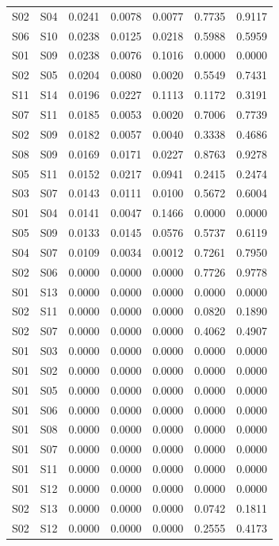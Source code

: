 \begin{table}
\begin{tabular}{llrrrrr}
S02 & S04 & 0.0241 & 0.0078 & 0.0077 & 0.7735 & 0.9117 \\
S06 & S10 & 0.0238 & 0.0125 & 0.0218 & 0.5988 & 0.5959 \\
S01 & S09 & 0.0238 & 0.0076 & 0.1016 & 0.0000 & 0.0000 \\
S02 & S05 & 0.0204 & 0.0080 & 0.0020 & 0.5549 & 0.7431 \\
S11 & S14 & 0.0196 & 0.0227 & 0.1113 & 0.1172 & 0.3191 \\
S07 & S11 & 0.0185 & 0.0053 & 0.0020 & 0.7006 & 0.7739 \\
S02 & S09 & 0.0182 & 0.0057 & 0.0040 & 0.3338 & 0.4686 \\
S08 & S09 & 0.0169 & 0.0171 & 0.0227 & 0.8763 & 0.9278 \\
S05 & S11 & 0.0152 & 0.0217 & 0.0941 & 0.2415 & 0.2474 \\
S03 & S07 & 0.0143 & 0.0111 & 0.0100 & 0.5672 & 0.6004 \\
S01 & S04 & 0.0141 & 0.0047 & 0.1466 & 0.0000 & 0.0000 \\
S05 & S09 & 0.0133 & 0.0145 & 0.0576 & 0.5737 & 0.6119 \\
S04 & S07 & 0.0109 & 0.0034 & 0.0012 & 0.7261 & 0.7950 \\
S02 & S06 & 0.0000 & 0.0000 & 0.0000 & 0.7726 & 0.9778 \\
S01 & S13 & 0.0000 & 0.0000 & 0.0000 & 0.0000 & 0.0000 \\
S02 & S11 & 0.0000 & 0.0000 & 0.0000 & 0.0820 & 0.1890 \\
S02 & S07 & 0.0000 & 0.0000 & 0.0000 & 0.4062 & 0.4907 \\
S01 & S03 & 0.0000 & 0.0000 & 0.0000 & 0.0000 & 0.0000 \\
S01 & S02 & 0.0000 & 0.0000 & 0.0000 & 0.0000 & 0.0000 \\
S01 & S05 & 0.0000 & 0.0000 & 0.0000 & 0.0000 & 0.0000 \\
S01 & S06 & 0.0000 & 0.0000 & 0.0000 & 0.0000 & 0.0000 \\
S01 & S08 & 0.0000 & 0.0000 & 0.0000 & 0.0000 & 0.0000 \\
S01 & S07 & 0.0000 & 0.0000 & 0.0000 & 0.0000 & 0.0000 \\
S01 & S11 & 0.0000 & 0.0000 & 0.0000 & 0.0000 & 0.0000 \\
S01 & S12 & 0.0000 & 0.0000 & 0.0000 & 0.0000 & 0.0000 \\
S02 & S13 & 0.0000 & 0.0000 & 0.0000 & 0.0742 & 0.1811 \\
S02 & S12 & 0.0000 & 0.0000 & 0.0000 & 0.2555 & 0.4173 \\

\end{tabular}
\end{table}
